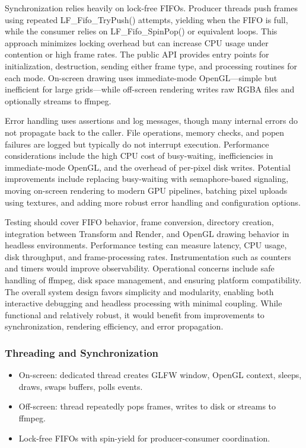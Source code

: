 \documentclass[12pt,a4paper]{article}
\begin{document}
Synchronization relies heavily on lock-free FIFOs. Producer threads push frames using repeated LF\_Fifo\_TryPush() attempts, yielding when the FIFO is full, while the consumer relies on LF\_Fifo\_SpinPop() or equivalent loops. This approach minimizes locking overhead but can increase CPU usage under contention or high frame rates. The public API provides entry points for initialization, destruction, sending either frame type, and processing routines for each mode. On-screen drawing uses immediate-mode OpenGL—simple but inefficient for large grids—while off-screen rendering writes raw RGBA files and optionally streams to ffmpeg.

Error handling uses assertions and log messages, though many internal errors do not propagate back to the caller. File operations, memory checks, and popen failures are logged but typically do not interrupt execution. Performance considerations include the high CPU cost of busy-waiting, inefficiencies in immediate-mode OpenGL, and the overhead of per-pixel disk writes. Potential improvements include replacing busy-waiting with semaphore-based signaling, moving on-screen rendering to modern GPU pipelines, batching pixel uploads using textures, and adding more robust error handling and configuration options.

Testing should cover FIFO behavior, frame conversion, directory creation, integration between Transform and Render, and OpenGL drawing behavior in headless environments. Performance testing can measure latency, CPU usage, disk throughput, and frame-processing rates. Instrumentation such as counters and timers would improve observability. Operational concerns include safe handling of ffmpeg, disk space management, and ensuring platform compatibility. The overall system design favors simplicity and modularity, enabling both interactive debugging and headless processing with minimal coupling. While functional and relatively robust, it would benefit from improvements to synchronization, rendering efficiency, and error propagation.

\subsubsection{Threading and Synchronization}

\begin{itemize}
    \item On-screen: dedicated thread creates GLFW window, OpenGL context, sleeps, draws, swaps buffers, polls events.
    \item Off-screen: thread repeatedly pops frames, writes to disk or streams to ffmpeg.
    \item Lock-free FIFOs with spin-yield for producer-consumer coordination.
\end{itemize}
\end{document}
